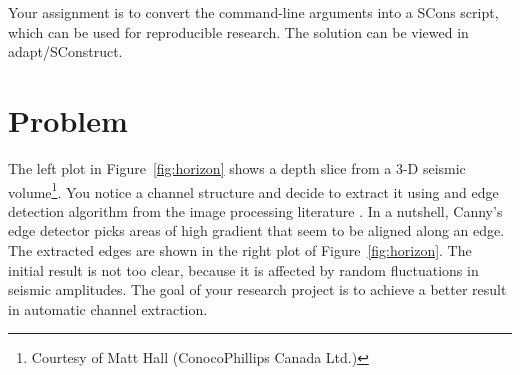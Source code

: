 Your assignment is to convert the command-line arguments into a SCons script, which can be used for reproducible research. The solution can be viewed in adapt/SConstruct.
%


\section{Problem}


The left plot in Figure~\ref{fig:horizon} shows a depth slice from a 3-D
seismic volume\footnote{Courtesy of Matt Hall (ConocoPhillips Canada
Ltd.)}. You notice a channel structure and decide to extract it using
and edge detection algorithm from the image processing literature
\cite[]{canny}. In a nutshell, Canny's edge detector picks areas of
high gradient that seem to be aligned along an edge. The extracted
edges are shown in the right plot of Figure~\ref{fig:horizon}. The initial
result is not too clear, because it is affected by random
fluctuations in seismic amplitudes. The goal of your research project
is to achieve a better result in automatic channel extraction.

